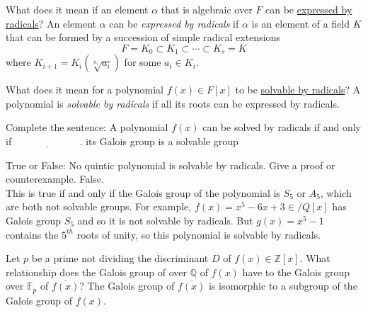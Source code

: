 \documentclass[avery5371,grid]{flashcards}
\newcommand{\Z}{\mathbb{Z}}
\newcommand{\Q}{\mathbb{Q}}
\newcommand{\F}{\mathbb{F}}
\newcommand{\blank}{$\; \underline{\hspace{1in}} \; $}
\begin{document}
\begin{flashcard}[Fields]{What does it mean if an element $\alpha$ that is algebraic over $F$ can be \underline{expressed by radicals}?}
 An element $\alpha$ can be \emph{expressed by radicals} if $\alpha$ is an element of a field $K$ that can be formed by a succession of simple radical extensions
 $$F = K_0 \subset K_1 \subset \cdots \subset K_s = K$$
 where $K_{i+1} = K_i(\sqrt[n_i]{a_i})$ for some $a_i \in K_i$.
\end{flashcard}

\begin{flashcard}[Fields]{What does it mean for a polynomial $f(x) \in F[x]$ to be \underline{solvable by radicals}?}
 A polynomial is \emph{solvable by radicals} if all its roots can be expressed by radicals.
\end{flashcard}

\begin{flashcard}[Fields]{Complete the sentence: A polynomial $f(x)$ can be solved by radicals if and only if \blank .}
 its Galois group is a solvable group
\end{flashcard}

\begin{flashcard}[Fields]{True or False: No quintic polynomial is solvable by radicals. Give a proof or counterexample.}
 False. \\
 
 This is true if and only if the Galois group of the polynomial is $S_5$ or $A_5$, which are both not solvable groups. For example, $f(x) = x^5 - 6x+3 \in /Q[x]$ has Galois group $S_5$ and so it is not solvable by radicals. But $g(x) = x^5 - 1$ contains the $5^{th}$ roots of unity, so this polynomial is solvable by radicals.
\end{flashcard}

\begin{flashcard}[Fields]{Let $p$ be a prime not dividing the discriminant $D$ of $f(x) \in \Z[x]$. What relationship does the Galois group of over $\Q$ of $f(x)$ have to the Galois group over $\F_p$ of $\overline{f(x)}$?}
 The Galois group of $\overline{f(x)}$ is isomorphic to a subgroup of the Galois group of $f(x)$.
\end{flashcard}
\end{document}
